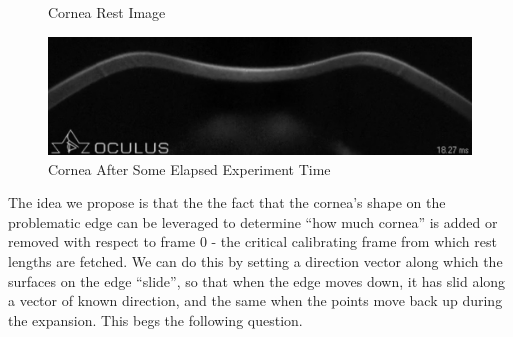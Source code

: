 \documentclass[epjST]{svjour}
\begin{document}
\begin{itemize}
\begin{figure}[h]
        \caption{Cornea Rest Image}
        \label{fig:nodeform}
    \end{figure}
    \begin{figure}[h]
        \centering
        \includegraphics[width=1\linewidth]{figures/Compression/deform.png}
        \caption{Cornea After Some Elapsed Experiment Time}
        \label{fig:deform}
    \end{figure}
\end{itemize}
The idea we propose is that the
the fact that the cornea's shape on the problematic edge can be leveraged to determine ``how much cornea'' is added or removed with respect to frame 0 - the critical calibrating frame from which rest lengths are fetched. We can do this by setting a direction vector along which the surfaces on the edge ``slide'', so that when the edge moves down, it has slid along a vector of known direction, and the same when the points move back up during the expansion. This begs the following question.
\end{document}
